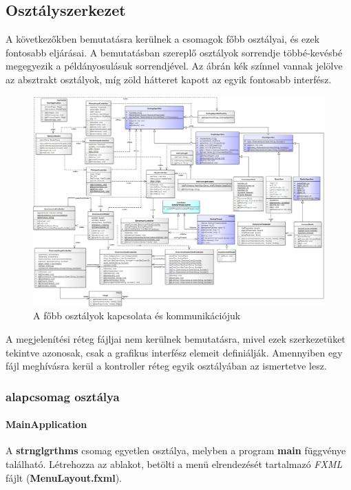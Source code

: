 \documentclass{elteikthesis}
\newcommand{\hiddenparagraph}[1]{
	\stepcounter{paragraph}
	\paragraph*{{#1}}
}
\begin{document}
\subsection{Osztályszerkezet}
A következőkben bemutatásra kerülnek a csomagok főbb osztályai, és ezek fontosabb eljárásai. A bemutatásban szereplő osztályok sorrendje többé-kevésbé megegyezik a példányosulásuk sorrendjével. Az ábrán kék színnel vannak jelölve az absztrakt osztályok, míg zöld hátteret kapott az egyik fontosabb interfész.\par
\begin{figure}[H]
	\centering
	\includegraphics[width=\textwidth]{pics/plan_class.png}
	\caption{A főbb osztályok kapcsolata és kommunikációjuk}
\end{figure}
A megjelenítési réteg fájljai nem kerülnek bemutatásra, mivel ezek szerkezetüket tekintve azonosak, csak a grafikus interfész elemeit definiálják. Amennyiben egy fájl meghívásra kerül a kontroller réteg egyik osztályában az ismertetve lesz.
\subsubsection{alapcsomag osztálya}
\hiddenparagraph{MainApplication}
A \textbf{strnglgrthms} csomag egyetlen osztálya, melyben a program \textbf{main} függvénye található. Létrehozza az ablakot, betölti a menü elrendezését tartalmazó \emph{FXML} fájlt (\textbf{MenuLayout.fxml}).
\end{document}
